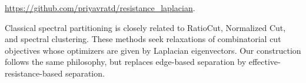 \documentclass[12pt,a4paper]{amsart}
\theoremstyle{remark}
\theoremstyle{definition}
\newcommand{\1}{\mathbf{1}}
\newcommand{\0}{\mathbf{0}}
\begin{document}
\url{https://github.com/priyavratd/resistance_laplacian}.

Classical spectral partitioning is closely related to RatioCut, Normalized Cut, and spectral clustering. These methods seek relaxations of combinatorial cut objectives whose optimizers are given by Laplacian eigenvectors. Our construction follows the same philosophy, but replaces edge-based separation by effective-resistance-based separation.

\end{document}
